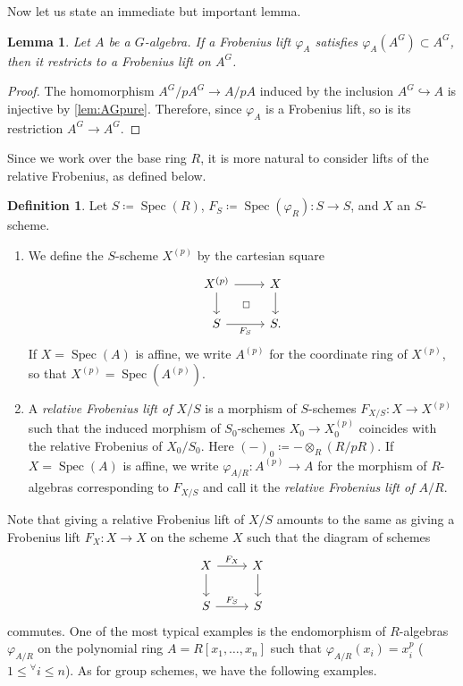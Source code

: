 \documentclass[uplatex,11pt,a4paper]{amsart} %
\numberwithin{equation}{section}
\numberwithin{figure}{section}
\numberwithin{table}{section}
\theoremstyle{plain}
\newtheorem{lemma}[theorem]{Lemma}
\theoremstyle{definition}
\newtheorem{definition}[theorem]{Definition}
\DeclareMathOperator{\Spec}{Spec}
\begin{document}
Now let us state an immediate but important lemma.

\begin{lemma}
\label{lem:Grest}
Let $A$ be a $G$-algebra. If a Frobenius lift $\varphi_A$ satisfies $\varphi_A(A^G)\subset A^G$, then it restricts to a Frobenius lift on $A^G$.
\end{lemma}

\begin{proof}
The homomorphism $A^G/pA^G\to A/pA$ induced by the inclusion $A^G\hookrightarrow A$ is injective by \cref{lem:AGpure}. Therefore, since $\varphi_A$ is a Frobenius lift, so is its restriction $A^G\to A^G$.
\end{proof}

Since we work over the base ring $R$, it is more natural to consider lifts of the relative Frobenius, as defined below.

\begin{definition}
\label{def:relFlift}
Let $S\coloneqq\Spec(R)$, $F_S\coloneqq\Spec(\varphi_R)\colon S\to S$, and $X$ an $S$-scheme.
  \begin{enumerate}
  \item We define the $S$-scheme $X^{(p)}$ by the cartesian square
  \[
  \begin{tikzcd}
  X^{(p)} \rar \dar \ar[rd,phantom,"\scriptstyle\Box"] & X \dar \\
  S \rar["F_S"'] & S.
  \end{tikzcd}
  \]
  If $X=\Spec(A)$ is affine, we write $A^{(p)}$ for the coordinate ring of $X^{(p)}$, so that $X^{(p)}=\Spec(A^{(p)})$.
  \item A \emph{relative Frobenius lift of $X/S$} is a morphism of $S$-schemes $F_{X/S}\colon X\to X^{(p)}$ such that the induced morphism of $S_0$-schemes $X_0\to X_0^{(p)}$ coincides with the relative Frobenius of $X_0/S_0$. Here $(-)_0\coloneqq-\otimes_R(R/pR)$.
  If $X=\Spec(A)$ is affine, we write $\varphi_{A/R}\colon A^{(p)}\to A$ for the morphism of $R$-algebras corresponding to $F_{X/S}$ and call it the \emph{relative Frobenius lift of $A/R$}.
  \end{enumerate}
\end{definition}

Note that giving a relative Frobenius lift of $X/S$ amounts to the same as giving a Frobenius lift $F_X\colon X\to X$ on the scheme $X$ such that the diagram of schemes
\[
\begin{tikzcd}
X \rar["F_X"] \dar & X \dar \\
S \rar["F_S"] & S
\end{tikzcd}
\]
commutes. One of the most typical examples is the endomorphism of $R$-algebras $\varphi_{A/R}$ on the polynomial ring $A=R[x_1,\ldots,x_n]$ such that $\varphi_{A/R}(x_i)=x_i^p$ ($1\leq{}^\forall i\leq n$). As for group schemes, we have the following examples.
\end{document}
